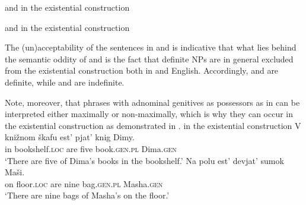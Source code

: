 \documentclass[output=paper,
colorlinks,
citecolor=brown,
newtxmath
]{langscibook}
\begin{document}

\ea \label{DE}  and  in the existential construction
\z\z

\ea\label{DE2}  and  in the existential construction
\z\z

\noindent The (un)acceptability of the sentences in  and  is indicative that what lies behind the semantic oddity of  and  is the fact that definite NPs are in general excluded from the existential construction both in  and English. Accordingly,  and  are definite, while  and  are indefinite.

Note, moreover, that phrases with adnominal genitives as possessors as in  can be interpreted either maximally or non-maximally, which is why they can occur in the existential construction as demonstrated in .
    \ea\label{DE-GEN} in the existential construction
	\ea\label{DEgen}
	\gll	V {knižnom škafu} est' pjat' knig Dimy.\\
	    	in bookshelf.\textsc{loc} are five book.\textsc{gen.pl} Dima.\textsc{gen}\\
	\glt	`There are five of Dima's books in the bookshelf.'
	\ex\label{DEgen2}
	\gll	Na polu est' devjat' sumok Maši.\\
			on floor.\textsc{loc} are nine bag.\textsc{gen.pl} Masha.\textsc{gen}\\
	\glt	`There are nine bags of Masha's on the floor.'
	\z\z
\end{document}
